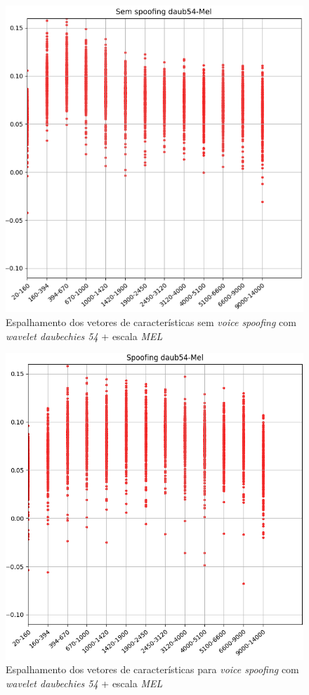 		\begin{figure}[!h]
			\centering
			\includegraphics[width=.70\linewidth, height=.68\linewidth]{images/results/barkVersusMel/liveDaub54Mel}
			\caption{Espalhamento dos vetores de características sem \textit{voice spoofing} com \textit{wavelet daubechies 54} + escala \textit{MEL} }
			\label{fig:livedaub54mel}
		\end{figure}

		\begin{figure}[!h]
			\centering
			\includegraphics[width=.70\linewidth, height=.68\linewidth]{images/results/barkVersusMel/spoofingDaub54Mel}
			\caption{Espalhamento dos vetores de características para \textit{voice spoofing} com \textit{wavelet daubechies 54} + escala \textit{MEL} }
			\label{fig:spoofingdaub54mel}
		\end{figure}